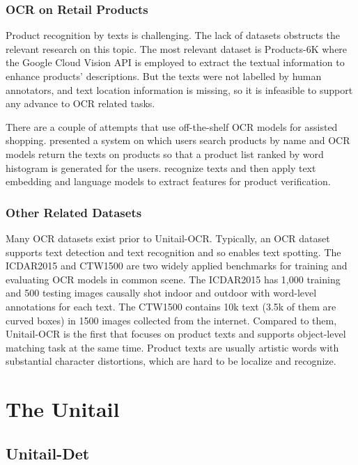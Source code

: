 \documentclass[runningheads]{llncs}
\begin{document}
\subsubsection{OCR on Retail Products}
Product recognition by texts is challenging. The lack of datasets obstructs the relevant research on this topic. The most relevant dataset is Products-6K\cite{products-6k} where the Google Cloud Vision API is employed to extract the textual information to enhance products' descriptions. But the texts were not labelled by human annotators, and text location information is missing, so it is infeasible to support any advance to OCR related tasks. 

There are a couple of attempts that use off-the-shelf OCR models for assisted shopping. \cite{assist_shopping} presented a system on which users search products by name and OCR models return the texts on products so that a product list ranked by word histogram
is generated for the users. \cite{mondrianocr} recognize texts and then apply text embedding and language models to extract features for product verification.

\subsubsection{Other Related Datasets}
Many OCR datasets \cite{singh2021textocr,iiit5k,totaltext,ICDAR15,icdar2013,ctw1500,CUTE80,MSRA-TD500,Synth90k,SynthText} exist prior to Unitail-OCR. Typically, an OCR dataset supports text detection and text recognition and so enables text spotting. 
The ICDAR2015\cite{ICDAR15} and CTW1500\cite{ctw1500} are two widely applied benchmarks for training and evaluating OCR models in common scene. The ICDAR2015 has 1,000 training and 500 testing images causally shot indoor and outdoor with word-level annotations for each text. The CTW1500 contains 10k text (3.5k of them are curved boxes) in 1500 images collected from the internet. Compared to them, Unitail-OCR is the first that focuses on product texts and supports object-level matching task at the same time. Product texts are usually artistic words with substantial character distortions, which are hard to be localize and recognize. 

\section{The Unitail}

\subsection{Unitail-Det}
\end{document}
